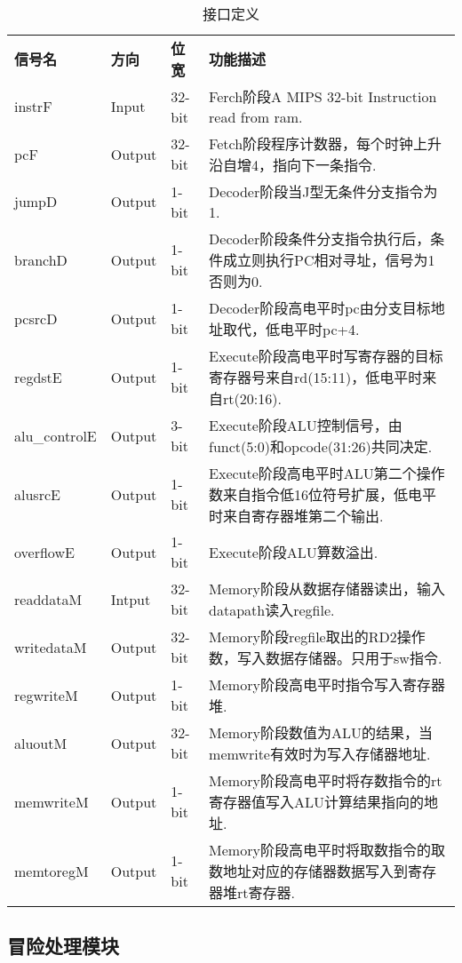 \begin{table}[htp]
	\caption{接口定义}\label{tab:signaldef}
	\begin{center}
		\begin{tabular}{lllp{9cm}}
		\hline
		\textbf{信号名} & \textbf{方向} & \textbf{位宽} & \textbf{功能描述}\\  
		instrF   		& Input & 32-bit & Ferch阶段A MIPS 32-bit Instruction read from ram.\\ 
		pcF		        & Output& 32-bit & Fetch阶段程序计数器，每个时钟上升沿自增4，指向下一条指令.\\  
		jumpD			& Output& 1-bit  & Decoder阶段当J型无条件分支指令为1.\\ 
		branchD			& Output& 1-bit  & Decoder阶段条件分支指令执行后，条件成立则执行PC相对寻址，信号为1否则为0.\\ 
		pcsrcD			& Output& 1-bit  & Decoder阶段高电平时pc由分支目标地址取代，低电平时pc+4.\\  
		regdstE			& Output& 1-bit  & Execute阶段高电平时写寄存器的目标寄存器号来自rd(15:11)，低电平时来自rt(20:16).\\  
		alu\_controlE	& Output& 3-bit  & Execute阶段ALU控制信号，由funct(5:0)和opcode(31:26)共同决定.\\  
		alusrcE			& Output& 1-bit  & Execute阶段高电平时ALU第二个操作数来自指令低16位符号扩展，低电平时来自寄存器堆第二个输出.\\ 
		overflowE		& Output& 1-bit  & Execute阶段ALU算数溢出.\\  
		readdataM		& Intput& 32-bit & Memory阶段从数据存储器读出，输入datapath读入regfile.\\
		writedataM		& Output& 32-bit & Memory阶段regfile取出的RD2操作数，写入数据存储器。只用于sw指令.\\ 
		regwriteM		& Output& 1-bit  & Memory阶段高电平时指令写入寄存器堆.\\  
		aluoutM		    & Output& 32-bit & Memory阶段数值为ALU的结果，当memwrite有效时为写入存储器地址.\\  
		memwriteM		& Output& 1-bit  & Memory阶段高电平时将存数指令的rt寄存器值写入ALU计算结果指向的地址.\\  
		memtoregM		& Output& 1-bit  & Memory阶段高电平时将取数指令的取数地址对应的存储器数据写入到寄存器堆rt寄存器.\\  
		\hline
		\end{tabular}
	\end{center}
	\end{table}


\subsection{冒险处理模块}\label{sub:hazard}
